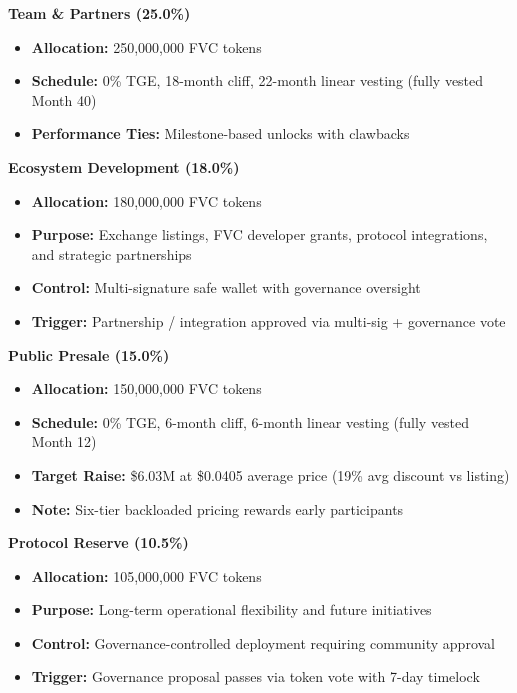 \documentclass[
  paper=a4,
  ,captions=tableheading
]{scrartcl}
\providecommand{\tightlist}{%
  \setlength{\itemsep}{0pt}\setlength{\parskip}{0pt}}
\begin{document}
\begin{samepage}

\textbf{Team \& Partners (25.0\%)}

\begin{itemize}
\tightlist
\item
  \textbf{Allocation:} 250,000,000 FVC tokens
\item
  \textbf{Schedule:} 0\% TGE, 18-month cliff, 22-month linear vesting (fully vested Month 40)
\item
  \textbf{Performance Ties:} Milestone-based unlocks with clawbacks
\end{itemize}

\textbf{Ecosystem Development (18.0\%)}

\begin{itemize}
\tightlist
\item
  \textbf{Allocation:} 180,000,000 FVC tokens
\item
  \textbf{Purpose:} Exchange listings, FVC developer grants, protocol integrations, and strategic partnerships
\item
  \textbf{Control:} Multi-signature safe wallet with governance oversight
\item
  \textbf{Trigger:} Partnership / integration approved via multi-sig + governance vote
\end{itemize}

\textbf{Public Presale (15.0\%)}

\begin{itemize}
\tightlist
\item
  \textbf{Allocation:} 150,000,000 FVC tokens
\item
  \textbf{Schedule:} 0\% TGE, 6-month cliff, 6-month linear vesting (fully vested Month 12)
\item
  \textbf{Target Raise:} \$6.03M at \$0.0405 average price (19\% avg discount vs listing)
\item
  \textbf{Note:} Six-tier backloaded pricing rewards early participants
\end{itemize}
\end{samepage}

\textbf{Protocol Reserve (10.5\%)}

\begin{itemize}
\tightlist
\item
  \textbf{Allocation:} 105,000,000 FVC tokens
\item
  \textbf{Purpose:} Long-term operational flexibility and future initiatives
\item
  \textbf{Control:} Governance-controlled deployment requiring community approval
\item
  \textbf{Trigger:} Governance proposal passes via token vote with 7-day timelock
\end{itemize}
\end{document}
